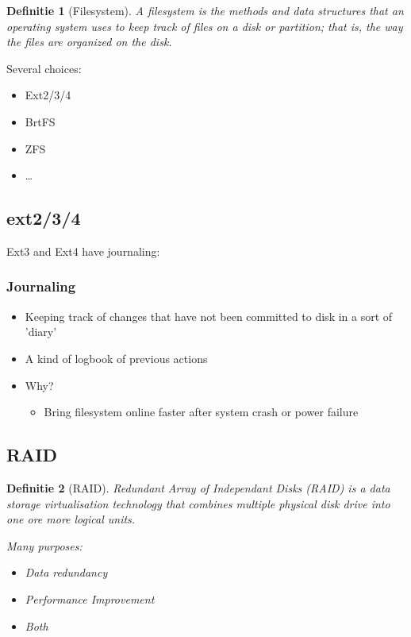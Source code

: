 \documentclass{article}
\newtheorem{theorem}{Definitie}[section]
\begin{document}
\begin{theorem}[Filesystem]
    A filesystem is the methods and data structures that an operating system uses to keep track of files on a disk or partition; that is, the way the files are organized on the disk.
\end{theorem}

Several choices:

\begin{itemize}
    \item Ext2/3/4
    \item BrtFS
    \item ZFS
    \item \dots
\end{itemize}

\subsection{ext2/3/4}

Ext3 and Ext4 have journaling:

\subsubsection{Journaling}

\begin{itemize}
    \item Keeping track of changes that have not been committed to disk in a sort of 'diary'
    \item A kind of logbook of previous actions
    \item Why?
    \begin{itemize}
        \item Bring filesystem online faster after system crash or power failure
    \end{itemize}
\end{itemize}

\subsection{RAID}

\begin{theorem}[RAID]
    Redundant Array of Independant Disks (RAID) is a data storage virtualisation technology that combines multiple physical disk drive into one ore more logical units.

    Many purposes:

    \begin{itemize}
        \item Data redundancy
        \item Performance Improvement
        \item Both
    \end{itemize}
\end{theorem}
\end{document}
